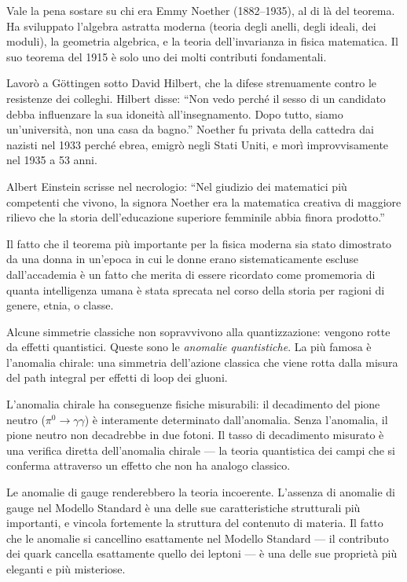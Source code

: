 \documentclass[12pt,a4paper,openany]{book}
\newcommand{\sezione}[1]{\vspace{1.2em}{\large\bfseries #1}\vspace{0.5em}\par}
\begin{document}
Vale la pena sostare su chi era Emmy Noether (1882--1935), al di là del teorema. Ha sviluppato l'algebra astratta moderna (teoria degli anelli, degli ideali, dei moduli), la geometria algebrica, e la teoria dell'invarianza in fisica matematica. Il suo teorema del 1915 è solo uno dei molti contributi fondamentali.

Lavorò a Göttingen sotto David Hilbert, che la difese strenuamente contro le resistenze dei colleghi. Hilbert disse: ``Non vedo perché il sesso di un candidato debba influenzare la sua idoneità all'insegnamento. Dopo tutto, siamo un'università, non una casa da bagno.'' Noether fu privata della cattedra dai nazisti nel 1933 perché ebrea, emigrò negli Stati Uniti, e morì improvvisamente nel 1935 a 53 anni.

Albert Einstein scrisse nel necrologio: ``Nel giudizio dei matematici più competenti che vivono, la signora Noether era la matematica creativa di maggiore rilievo che la storia dell'educazione superiore femminile abbia finora prodotto.''

Il fatto che il teorema più importante per la fisica moderna sia stato dimostrato da una donna in un'epoca in cui le donne erano sistematicamente escluse dall'accademia è un fatto che merita di essere ricordato come promemoria di quanta intelligenza umana è stata sprecata nel corso della storia per ragioni di genere, etnia, o classe.

\sezione{Le simmetrie anomale: quando la quantizzazione rompe la simmetria}

Alcune simmetrie classiche non sopravvivono alla quantizzazione: vengono rotte da effetti quantistici. Queste sono le \textit{anomalie quantistiche}. La più famosa è l'anomalia chirale: una simmetria dell'azione classica che viene rotta dalla misura del path integral per effetti di loop dei gluoni.

L'anomalia chirale ha conseguenze fisiche misurabili: il decadimento del pione neutro ($\pi^0 \to \gamma\gamma$) è interamente determinato dall'anomalia. Senza l'anomalia, il pione neutro non decadrebbe in due fotoni. Il tasso di decadimento misurato è una verifica diretta dell'anomalia chirale --- la teoria quantistica dei campi che si conferma attraverso un effetto che non ha analogo classico.

Le anomalie di gauge renderebbero la teoria incoerente. L'assenza di anomalie di gauge nel Modello Standard è una delle sue caratteristiche strutturali più importanti, e vincola fortemente la struttura del contenuto di materia. Il fatto che le anomalie si cancellino esattamente nel Modello Standard --- il contributo dei quark cancella esattamente quello dei leptoni --- è una delle sue proprietà più eleganti e più misteriose.
\end{document}
